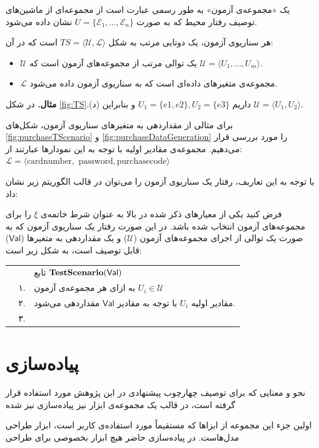 \begin{definition}
یک «مجموعه‌ی آزمون» به طور رسمی عبارت است از مجموعه‌‌ای از ماشین‌های توصیف رفتار محیط که به صورت
$U = \{\mathcal{E}_1, \dots, \mathcal{E}_n\}$ 
نشان داده می‌شود.
\end{definition}

\begin{definition}
هر سناریوی آزمون، یک دوتایی مرتب به شکل  $TS = \langle \mathcal{U}, \mathcal{L} \rangle$ است که در آن:
\begin{itemize}
\item $\mathcal{U}$ یک توالی مرتب از مجموعه‌های آزمون است که
$\mathcal{U} = \langle U_1, \dots, U_m \rangle $.
\item $\mathcal{L}$ مجموعه‌ی متغیرهای داده‌ای است که به سناریوی آزمون داده می‌شود.
\end{itemize}

\end{definition}
\textbf{مثال. } در شکل \ref{fig:TS}.(د) داریم
$U_1 = \{e1, e2\}, U_2 = \{e3\}$
و بنابراین
$\mathcal{U} = \langle U_1, U_2 \rangle$.

برای مثالی از مقداردهی به متغیرهای سناریوی آزمون، شکل‌های \ref{fig:purchaseTScenario} و \ref{fig:purchaseDataGeneration} را مورد بررسی قرار می‌دهیم. مجموعه‌ی مقادیر اولیه با توجه به این نمودارها عبارتند از:
 $\mathcal{L} = \langle \text{cardnumber}, \text{ password}, \text{purchasecode} \rangle$

با توجه به این تعاریف، رفتار یک سناریوی آزمون را می‌توان در قالب الگوریتم زیر نشان داد:

\begin{algorithm}
\label{algorithm:enviocoTScenario}
فرض کنید یکی از معیارهای ذکر شده در بالا به عنوان شرط خاتمه‌ی $\xi$ را برای مجموعه‌های آزمون انتخاب شده باشد. در این صورت رفتار یک سناریوی آزمون که به صورت یک توالی از اجرای مجموعه‌های آزمون ($\mathcal{U}$) و یک مقداردهی به متغیرها ($\mathsf{Val}$) قابل توصیف است، به شکل زیر است:

\begin{supertabular}{ c l | p{14cm} } 
&&تابع  $\text{\textbf{TestScenario}}(\mathsf{Val})$\\ [3mm]
	& ۱. & به ازای هر مجموعه‌ی آزمون 
$U_i \in \mathcal{U}$\\ [3mm]
	&۲. & \hspace{10mm} مقادیر اولیه $U_i$ با توجه به مقادیر $\mathsf{Val}$ مقداردهی می‌شود. \\[3mm]
	 &۳. & \hspace{10mm}  \\ [3mm]
\end{supertabular}
\end{algorithm}

\section{پیاده‌سازی}
\label{section:asyncImpl}
نحو و معنایی که برای توصیف چهارچوب پیشنهادی در این پژوهش مورد استفاده قرار گرفته است، در قالب یک مجموعه‌ی ابزار نیز پیاده‌سازی نیز شده 

اولین جزء این مجموعه از ابزاها که مستقیماً مورد استفاده‌ی کاربر است، ابزار طراحی مدل‌هاست. در پیاده‌سازی حاضر هیچ ابزار بخصوصی برای طراحی 